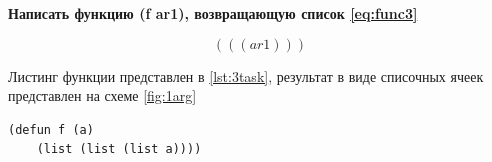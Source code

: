 \textbf{Написать функцию (f ar1), возвращающую список \ref{eq:func3}}

\begin{equation}
\label{eq:func3}
(((ar1)))
\end{equation}

Листинг функции представлен в \ref{lst:3task}, результат в виде списочных ячеек представлен на схеме \ref{fig:1arg}

\begin{lstlisting}[style=lispStyle, caption={Представление реализации функции (f ar1).},
                    label={lst:3task}]
(defun f (a)
    (list (list (list a))))

\end{lstlisting}

\begin{figure}[ht!]
\end{figure}



